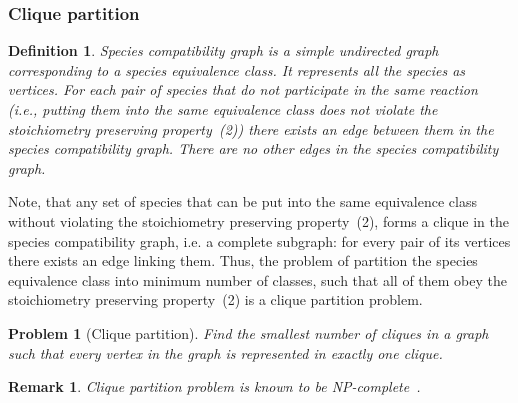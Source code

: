\documentclass[10pt]{bmc_article}
\newenvironment{bmcformat}{\baselineskip20pt\sloppy\setboolean{publ}{false}}{\baselineskip20pt\sloppy}
\begin{document}
\begin{bmcformat}
\subsubsection*{Clique partition}
\newtheorem{scg}[def]{Definition}
\begin{scg}
Species compatibility graph is a simple undirected graph corresponding to a species equivalence class. It represents all the species as vertices. For each pair of species that do not participate in the same reaction (i.e., putting them into the same equivalence class does not violate the stoichiometry preserving property~(2)) there exists an edge between them in the species compatibility graph. There are no other edges in the species compatibility graph.
\end{scg}
Note, that any set of species that can be put into the same equivalence class without violating the stoichiometry preserving property~(2), forms a clique  in the species compatibility graph, i.e. a complete subgraph: for every pair of its vertices there exists an edge linking them. Thus, the problem of partition the species equivalence class into minimum number of classes, such that all of them obey the stoichiometry preserving property~(2) is a clique partition problem.
\newtheorem{clp}[pbm]{Problem}
\begin{clp}[Clique partition]
Find the smallest number of cliques in a graph such that every vertex in the graph is represented in exactly one clique.
\end{clp}
\newtheorem{rem0}[rm]{Remark}
\begin{rem0}
Clique partition problem is known to be \textit{NP}-complete~\cite{Bhasker1991}. 
\end{rem0}



\end{bmcformat}
\end{document}
